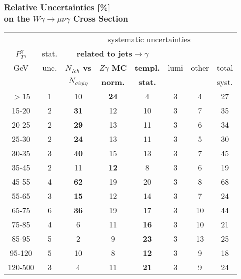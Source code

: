 \begin{frame}\frametitle{Relative Uncertainties [\%]\\ 
          on the $W\gamma\rightarrow\mu\nu\gamma$ Cross Section}

\begin{table}[h]
  \tiny
  \begin{center}
   \begin{tabular}{|c|c|c|c|c|c|c|c|}
    \hline
                   &     & \multicolumn{6}{|c|}{systematic uncertainties}     \\
    $P_T^{\gamma}$,  & stat. & \multicolumn{3}{|c|}{\color{blue}\bfseries{related to jets$\rightarrow\gamma$}} &  &  & \\
    GeV           & unc. & {\color{blue}\bfseries{$N_{Ich}$ vs}} &{\color{blue}\bfseries{$Z\gamma$ MC}}      &{\color{blue}\bfseries{templ.}} &  lumi & other & total\\ 
                  &     & {\color{blue}\bfseries{$N_{\sigma{i\eta i\eta}}$}} & {\color{blue}\bfseries{norm.}}    & {\color{blue}\bfseries{stat.}}  &  &  & syst.\\ \hline
    $>$15  & 1 & 10 & {\color{blue}\bfseries{24}} & 4 & 3 & 4 & 27 \\ \hline
    15-20 & 2 & {\color{blue}\bfseries{31}} & 12 & 10 & 3 & 7 & 35 \\ \hline
    20-25 & 2 & {\color{blue}\bfseries{29}} & 13 & 11 & 3 & 6 & 34 \\ \hline
    25-30 & 2 & {\color{blue}\bfseries{24}} & 13 & 11 & 3 & 5 & 30 \\ \hline
    30-35 & 3 & {\color{blue}\bfseries{40}} & 15 & 13 & 3 & 7 & 45 \\ \hline
    35-45 & 2 & 11 & {\color{blue}\bfseries{12}} & 8 & 3 & 6 & 19 \\ \hline
    45-55 & 4 & {\color{blue}\bfseries{62}} & 19 & 20 & 3 & 8 & 68 \\ \hline
    55-65 & 3 & {\color{blue}\bfseries{15}} & 12 & 14 & 3 & 7 & 24 \\ \hline
    65-75 & 6 & {\color{blue}\bfseries{36}} & 19 & 17 & 3 & 10 & 44 \\ \hline
    75-85 & 4 & 6 & 11 & {\color{blue}\bfseries{16}} & 3 & 10 & 21 \\ \hline
    85-95 & 5 & 2 & 9 & {\color{blue}\bfseries{23}} & 3 & 13 & 25 \\ \hline
    95-120 & 5 & 10 & 8 & {\color{blue}\bfseries{12}} & 3 & 9 & 18 \\ \hline
    120-500 & 3 & 4 & 11 & {\color{blue}\bfseries{21}} & 3 & 9 & 24 \\ \hline
  \end{tabular}
  \label{tab:systInPercent_MUON_WGamma}
  \end{center}
\end{table}
\end{frame}%
